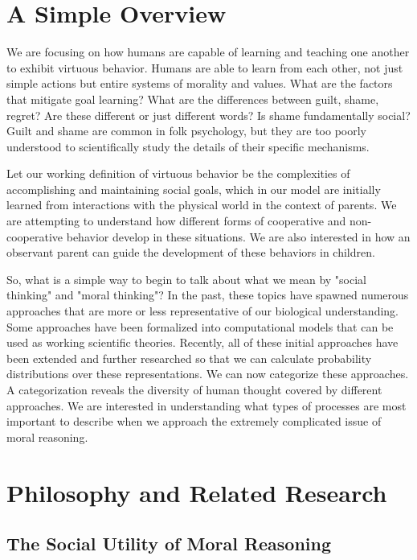 \section{A Simple Overview}

We are focusing on how humans are capable of learning and teaching one
another to exhibit virtuous behavior. Humans are able to learn from
each other, not just simple actions but entire systems of morality and
values. What are the factors that mitigate goal learning? What are the
differences between guilt, shame, regret? Are these different or just
different words? Is shame fundamentally social? Guilt and shame are
common in folk psychology, but they are too poorly understood to
scientifically study the details of their specific mechanisms.

Let our working definition of virtuous behavior be the complexities of
accomplishing and maintaining social goals, which in our model are
initially learned from interactions with the physical world in the
context of parents. We are attempting to understand how different
forms of cooperative and non-cooperative behavior develop in these
situations. We are also interested in how an observant parent can
guide the development of these behaviors in children.

So, what is a simple way to begin to talk about what we mean by
"social thinking" and "moral thinking"? In the past, these topics have
spawned numerous approaches that are more or less representative of
our biological understanding. Some approaches have been formalized
into computational models that can be used as working scientific
theories. Recently, all of these initial approaches have been extended
and further researched so that we can calculate probability
distributions over these representations. We can now categorize these
approaches. A categorization reveals the diversity of human thought
covered by different approaches. We are interested in understanding
what types of processes are most important to describe when we
approach the extremely complicated issue of moral reasoning.

\section{Philosophy and Related Research}

\subsection{The Social Utility of Moral Reasoning}

